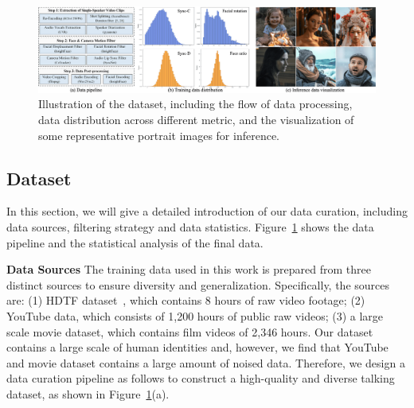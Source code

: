     
    


\begin{figure}[t]
    \centering
    \includegraphics[width=\linewidth]{figs/dataset_comp.png}
    \vspace{-7mm}
    \caption{{
Illustration of the dataset, including the flow of data processing, data distribution across different metric, and the visualization of some representative portrait images for inference.}}
    \label{fig:data_statistics}
\end{figure}


\subsection{Dataset}\label{sec:data}



In this section, we will give a detailed introduction of our data curation, including data sources, filtering strategy and data statistics.
Figure~\ref{fig:data_statistics} shows the data pipeline and the statistical analysis of the final data.

\noindent\textbf{Data Sources}
The training data used in this work is prepared from three distinct sources to ensure diversity and generalization. Specifically, the sources are: (1) HDTF dataset~\cite{zhang2021flow}, which contains 8 hours of raw video footage; (2) YouTube data, which consists of 1,200 hours of public raw videos; (3) a large scale movie dataset, which contains film videos of 2,346 hours. 
Our dataset contains a large scale of human identities and, however, we find that YouTube and movie dataset contains  a large amount of noised data. Therefore, we design a data curation pipeline as follows to construct a high-quality and diverse talking dataset, as shown in Figure~\ref{fig:data_statistics}(a).

